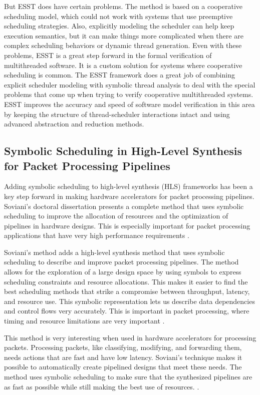 \documentclass[conference]{IEEEtran}
\begin{document}
 But ESST does have certain problems.  The method is based on a cooperative scheduling model, which could not work with systems that use preemptive scheduling strategies.  Also, explicitly modeling the scheduler can help keep execution semantics, but it can make things more complicated when there are complex scheduling behaviors or dynamic thread generation.  Even with these problems, ESST is a great step forward in the formal verification of multithreaded software. It is a custom solution for systems where cooperative scheduling is common. The ESST framework does a great job of combining explicit scheduler modeling with symbolic thread analysis to deal with the special problems that come up when trying to verify cooperative multithreaded systems.  ESST improves the accuracy and speed of software model verification in this area by keeping the structure of thread-scheduler interactions intact and using advanced abstraction and reduction methods.


\subsection{Symbolic Scheduling in High-Level Synthesis for Packet Processing Pipelines} 

 

 Adding symbolic scheduling to high-level synthesis (HLS) frameworks has been a key step forward in making hardware accelerators for packet processing pipelines.  Soviani's doctoral dissertation presents a complete method that uses symbolic scheduling to improve the allocation of resources and the optimization of pipelines in hardware designs. This is especially important for packet processing applications that have very high performance requirements \cite{soviani2007high}.

 Soviani's method adds a high-level synthesis method that uses symbolic scheduling to describe and improve packet processing pipelines.  The method allows for the exploration of a large design space by using symbols to express scheduling constraints and resource allocations. This makes it easier to find the best scheduling methods that strike a compromise between throughput, latency, and resource use.  This symbolic representation lets us describe data dependencies and control flows very accurately. This is important in packet processing, where timing and resource limitations are very important \cite{soviani2007high}.

 This method is very interesting when used in hardware accelerators for processing packets.  Processing packets, like classifying, modifying, and forwarding them, needs actions that are fast and have low latency.  Soviani's technique makes it possible to automatically create pipelined designs that meet these needs.  The method uses symbolic scheduling to make sure that the synthesized pipelines are as fast as possible while still making the best use of resources. \cite{soviani2007high}.
\end{document}
